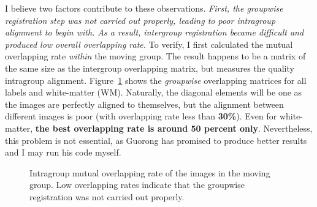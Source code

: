 \documentclass[preprint,review,12pt]{elsarticle}
\begin{document}
I believe two factors contribute to these observations. {\it First, the groupwise registration step was not carried out properly, leading to poor intragroup alignment to begin with. As a result, intergroup registration became difficult and produced low overall overlapping rate.} To verify, I first calculated the mutual overlapping rate \emph{within} the moving group. The result happens to be a matrix of the same size as the intergroup overlapping matrix, but measures the quality intragroup alignment. Figure~\ref{fig:groupwise} shows the \emph{groupwise} overlapping matrices for all labels and white-matter (WM). Naturally, the diagonal elements will be one as the images are perfectly aligned to themselves, but the alignment between different images is poor (with overlapping rate less than {\bf 30\%}). Even for white-matter, {\bf the best overlapping rate is around 50 percent only}. {Nevertheless, this problem is not essential, as Guorong has promised to produce better results and I may run his code myself.}



\begin{figure}
\begin{center}
\end{center}
\caption{Intragroup mutual overlapping rate of the images in the moving group. Low overlapping rates indicate that the groupwise registration was not carried out properly.}
\label{fig:groupwise}
\end{figure}
\end{document}
